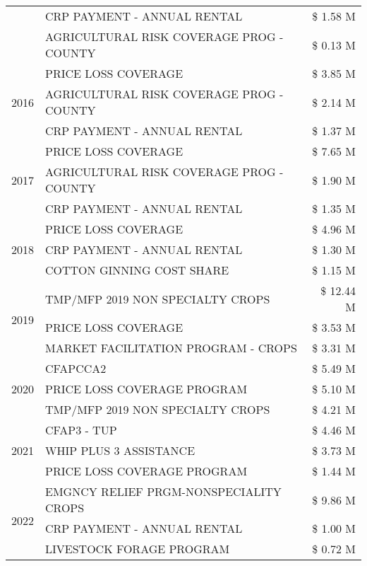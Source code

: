\begin{tabular}{llr}
 & CRP PAYMENT - ANNUAL RENTAL & \$ 1.58 M \\
 & AGRICULTURAL RISK COVERAGE PROG - COUNTY & \$ 0.13 M \\
\cline{1-3}
\multirow[t]{3}{*}{2016} & PRICE LOSS COVERAGE & \$ 3.85 M \\
 & AGRICULTURAL RISK COVERAGE PROG - COUNTY & \$ 2.14 M \\
 & CRP PAYMENT - ANNUAL RENTAL & \$ 1.37 M \\
\cline{1-3}
\multirow[t]{3}{*}{2017} & PRICE LOSS COVERAGE & \$ 7.65 M \\
 & AGRICULTURAL RISK COVERAGE PROG - COUNTY & \$ 1.90 M \\
 & CRP PAYMENT - ANNUAL RENTAL & \$ 1.35 M \\
\cline{1-3}
\multirow[t]{3}{*}{2018} & PRICE LOSS COVERAGE & \$ 4.96 M \\
 & CRP PAYMENT - ANNUAL RENTAL & \$ 1.30 M \\
 & COTTON GINNING COST SHARE & \$ 1.15 M \\
\cline{1-3}
\multirow[t]{3}{*}{2019} & TMP/MFP 2019 NON SPECIALTY CROPS & \$ 12.44 M \\
 & PRICE LOSS COVERAGE & \$ 3.53 M \\
 & MARKET FACILITATION PROGRAM - CROPS & \$ 3.31 M \\
\cline{1-3}
\multirow[t]{3}{*}{2020} & CFAPCCA2 & \$ 5.49 M \\
 & PRICE LOSS COVERAGE PROGRAM & \$ 5.10 M \\
 & TMP/MFP 2019 NON SPECIALTY CROPS & \$ 4.21 M \\
\cline{1-3}
\multirow[t]{3}{*}{2021} & CFAP3 - TUP & \$ 4.46 M \\
 & WHIP PLUS 3 ASSISTANCE & \$ 3.73 M \\
 & PRICE LOSS COVERAGE PROGRAM & \$ 1.44 M \\
\cline{1-3}
\multirow[t]{3}{*}{2022} & EMGNCY RELIEF PRGM-NONSPECIALITY CROPS & \$ 9.86 M \\
 & CRP PAYMENT - ANNUAL RENTAL & \$ 1.00 M \\
 & LIVESTOCK FORAGE PROGRAM & \$ 0.72 M \\
\cline{1-3}
\bottomrule
\end{tabular}
